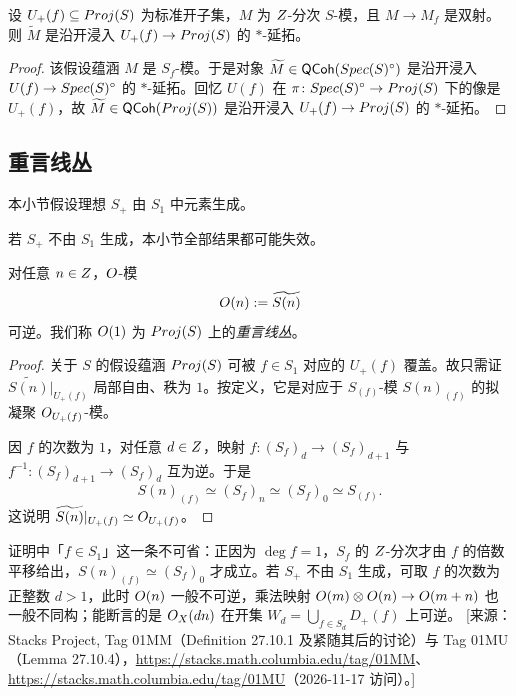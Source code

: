 \begin{lemma}\label{lem:26.1.10}
设 $U_+(f) \subseteq Proj(S)$ 为标准开子集，$M$ 为 $Z$-分次 $S$-模，且 $M \to M_f$ 是双射。则 $\widetilde{M}$ 是沿开浸入 $U_+(f) \to Proj(S)$ 的 $\ast$-延拓。
\end{lemma}

\begin{proof}
该假设蕴涵 $M$ 是 $S_f$-模。于是对象 $\widetilde{M} \in \mathsf{QCoh}(Spec(S)^{\circ})$ 是沿开浸入 $U(f) \to Spec(S)^{\circ}$ 的 $\ast$-延拓。回忆 $U(f)$ 在 $\pi \colon Spec(S)^{\circ} \to Proj(S)$ 下的像是 $U_+(f)$，故 $\widetilde{M} \in \mathsf{QCoh}(Proj(S))$ 是沿开浸入 $U_+(f) \to Proj(S)$ 的 $\ast$-延拓。
\end{proof}

\subsection{重言线丛}\label{sec:26.2}

本小节假设理想 $S_+$ 由 $S_1$ 中元素生成。

\begin{warning}\label{warn:26.2.1}
若 $S_+$ 不由 $S_1$ 生成，本小节全部结果都可能失效。
\end{warning}

\begin{propdef}\label{prop:26.2.2}
对任意 $n \in Z$，$O$-模
\[
O(n) := \widetilde{S(n)}
\]
可逆。我们称 $O(1)$ 为 $Proj(S)$ 上的\emph{重言线丛}。
\end{propdef}

\begin{proof}
关于 $S$ 的假设蕴涵 $Proj(S)$ 可被 $f \in S_1$ 对应的 $U_+(f)$ 覆盖。故只需证 $\widetilde{S(n)}|_{U_+(f)}$ 局部自由、秩为 $1$。按定义，它是对应于 $S_{(f)}$-模 $S(n)_{(f)}$ 的拟凝聚 $O_{U_+(f)}$-模。

因 $f$ 的次数为 $1$，对任意 $d \in Z$，映射 $f \colon (S_f)_d \to (S_f)_{d+1}$ 与 $f^{-1} \colon (S_f)_{d+1} \to (S_f)_d$ 互为逆。于是
\[
S(n)_{(f)} \simeq (S_f)_n \simeq (S_f)_0 \simeq S_{(f)}.
\]
这说明 $\widetilde{S(n)}|_{U_+(f)} \simeq O_{U_+(f)}$。
\end{proof}

\begin{yizhu}
证明中「$f \in S_1$」这一条不可省：正因为 $\deg f = 1$，$S_f$ 的 $Z$-分次才由 $f$ 的倍数平移给出，$S(n)_{(f)} \simeq (S_f)_0$ 才成立。若 $S_+$ 不由 $S_1$ 生成，可取 $f$ 的次数为正整数 $d > 1$，此时 $O(n)$ 一般不可逆，乘法映射 $O(m) \otimes O(n) \to O(m+n)$ 也一般不同构；能断言的是 $O_X(dn)$ 在开集 $W_d = \bigcup_{f \in S_d} D_+(f)$ 上可逆。
[来源：Stacks Project, Tag 01MM（Definition 27.10.1 及紧随其后的讨论）与 Tag 01MU（Lemma 27.10.4），\url{https://stacks.math.columbia.edu/tag/01MM}、\url{https://stacks.math.columbia.edu/tag/01MU}（2026-11-17 访问）。]
\end{yizhu}

